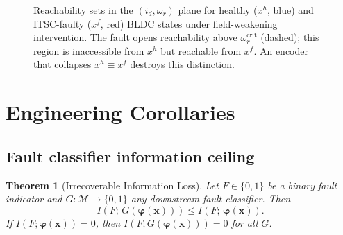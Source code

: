 \documentclass[10pt,twocolumn]{article}
\theoremstyle{plain}
\newtheorem{theorem}{Theorem}
\theoremstyle{definition}
\theoremstyle{remark}
\newcommand{\calM}{\mathcal{M}}
\newcommand{\bvphi}{\bm{\varphi}}
\begin{document}
\begin{figure}[t]
\centering
{}
\caption{Reachability sets in the $(i_d, \omega_r)$ plane for healthy ($x^h$,
blue) and ITSC-faulty ($x^f$, red) BLDC states under field-weakening
intervention. The fault opens reachability above $\omega_r^{\text{crit}}$
(dashed); this region is inaccessible from $x^h$ but reachable from $x^f$.
An encoder that collapses $x^h \equiv x^f$ destroys this distinction.}
\label{fig:reach}
\end{figure}

\section{Engineering Corollaries}
\label{sec:corollaries}

\subsection{Fault classifier information ceiling}

\begin{theorem}[Irrecoverable Information Loss]
\label{thm:dpi}
Let $F \in \{0,1\}$ be a binary fault indicator and
$G: \calM \to \{0,1\}$ any downstream fault classifier. Then
\begin{equation}
  I\!\left(F;\, G(\bvphi(\bm{x}))\right) \leq I\!\left(F;\, \bvphi(\bm{x})\right).
  \label{eq:dpi}
\end{equation}
If $I(F;\bvphi(\bm{x})) = 0$, then $I(F;G(\bvphi(\bm{x}))) = 0$ for all $G$.
\end{theorem}
\end{document}

